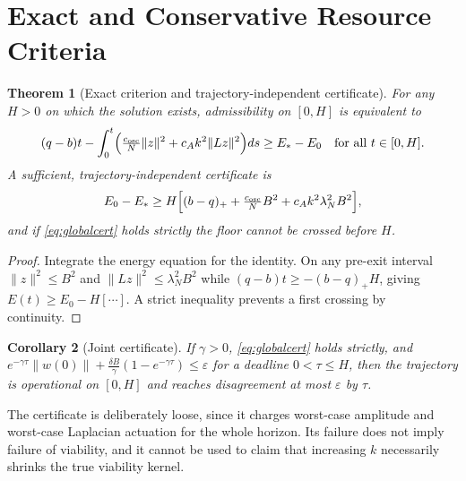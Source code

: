 \documentclass[11pt,notitlepage]{report}
\newtheorem{theorem}{Theorem}[chapter]
\newtheorem{corollary}[theorem]{Corollary}
\theoremstyle{definition}
\theoremstyle{remark}
\begin{document}
\section{Exact and Conservative Resource Criteria}
\begin{theorem}[Exact criterion and trajectory-independent certificate]\label{th:viability}
For any $H>0$ on which the solution exists, admissibility on $[0,H]$ is equivalent to
\[
(q-b)t-\int_0^t\Bigl(\tfrac{c_{\rm osc}}N\|z\|^2+c_Ak^2\|Lz\|^2\Bigr)ds\ge E_*-E_0\quad\text{for all }t\in[0,H].
\]
A sufficient, trajectory-independent certificate is
\begin{equation}\label{eq:globalcert}
E_0-E_*\ge H\Bigl[(b-q)_++\tfrac{c_{\rm osc}}NB^2+c_Ak^2\lambda_N^2B^2\Bigr],
\end{equation}
and if \eqref{eq:globalcert} holds strictly the floor cannot be crossed before $H$.
\end{theorem}
\begin{proof}
Integrate the energy equation for the identity. On any pre-exit interval $\|z\|^2\le B^2$ and $\|Lz\|^2\le\lambda_N^2B^2$ while $(q-b)t\ge-(b-q)_+H$, giving $E(t)\ge E_0-H[\cdots]$. A strict inequality prevents a first crossing by continuity.
\end{proof}
\begin{corollary}[Joint certificate]\label{cor:joint}
If $\gamma>0$, \eqref{eq:globalcert} holds strictly, and $e^{-\gamma\tau}\|w(0)\|+\tfrac{\delta B}\gamma(1-e^{-\gamma\tau})\le\varepsilon$ for a deadline $0<\tau\le H$, then the trajectory is operational on $[0,H]$ and reaches disagreement at most $\varepsilon$ by $\tau$.
\end{corollary}
The certificate is deliberately loose, since it charges worst-case amplitude and worst-case Laplacian actuation for the whole horizon. Its failure does not imply failure of viability, and it cannot be used to claim that increasing $k$ necessarily shrinks the true viability kernel.
\end{document}
